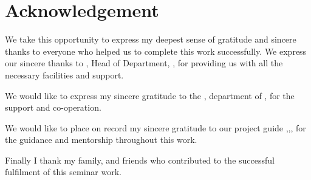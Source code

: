 \chapter*{Acknowledgement}%
%



\par We take this opportunity to express my deepest sense of gratitude and sincere thanks to everyone who helped us to complete this work successfully. We express our sincere thanks to \hod, Head of Department, \dept, \college\hspace*{2pt} for providing  us with all the necessary facilities and support.\par

We would like to express my sincere gratitude to the \projcordinatorA, \hspace*{2pt} department of \hspace*{2pt} \dept, \hspace*{2pt} \college \hspace*{2pt} \collegeplace \hspace*{2pt} for the support and co-operation.

We would like to place on record my sincere gratitude to our project guide \guide,\hspace*{2pt}\guidedes,\hspace*{2pt}\dept,\hspace*{2pt}\college \hspace*{2pt} %
for the guidance and mentorship throughout this work.

Finally I thank my family, and friends who contributed to the successful fulfilment of this seminar work.

\vspace*{30pt}
\begin{flushright}
	\textbf{\studentA}\\
	\textbf{\studentB}\\
	\textbf{\studentC}\\
	\textbf{\studentD}\\
\end{flushright}
\thispagestyle{plain}
